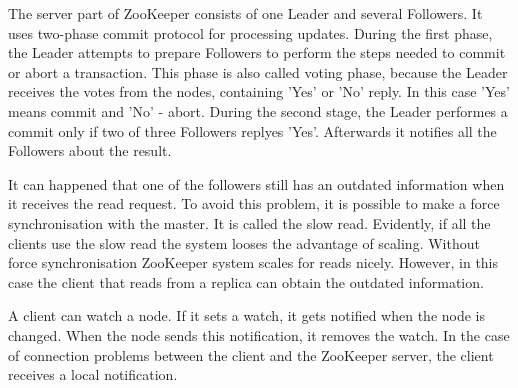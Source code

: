 The server part of ZooKeeper consists of one Leader and several Followers.
It uses two-phase commit protocol for processing updates.
During the first phase, the Leader attempts to prepare Followers to perform the steps needed to commit or abort a transaction.
This phase is also called voting phase, because the Leader receives the votes from the nodes, containing 'Yes' or 'No' reply.
In this case 'Yes' means commit and 'No' - abort.
During the second stage, the Leader performes a commit only if two of three Followers replyes 'Yes'.
Afterwards it notifies all the Followers about the result.

It can happened that one of the followers still has an outdated information when it receives the read request.
To avoid this problem, it is possible to make a force synchronisation with the master.
It is called the slow read.
Evidently, if all the clients use the slow read the system looses the advantage of scaling.
Without force synchronisation ZooKeeper system scales for reads nicely. 
However, in this case the client that reads from a replica can obtain the outdated information.

A client can watch a node.
If it sets a watch, it gets notified when the node is changed.
When the node sends this notification, it removes the watch.
In the case of connection problems between the client and the ZooKeeper server, the client receives a local notification.


